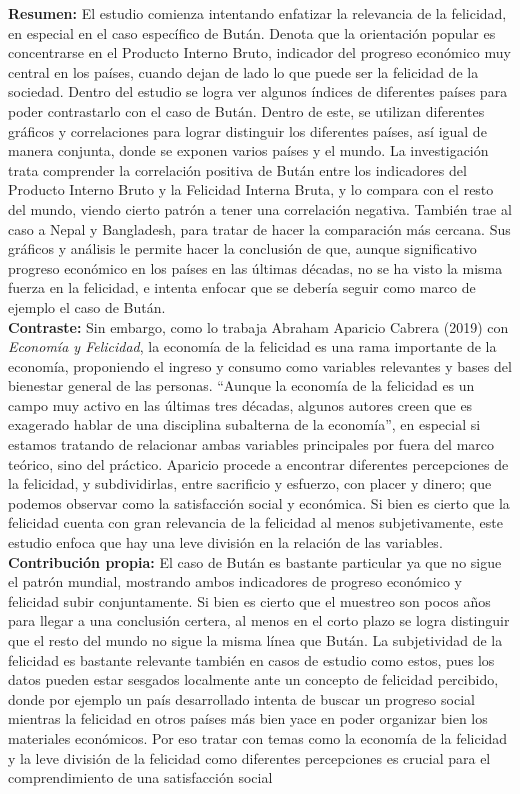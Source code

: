 \textbf{Resumen:} El estudio comienza intentando enfatizar la relevancia de la felicidad, en especial en el caso específico de Bután. Denota que la orientación popular es concentrarse en el Producto Interno Bruto, indicador del progreso económico muy central en los países, cuando dejan de lado lo que puede ser la felicidad de la sociedad. Dentro del estudio se logra ver algunos índices de diferentes países para poder contrastarlo con el caso de Bután. Dentro de este, se utilizan diferentes gráficos y correlaciones para lograr distinguir los diferentes países, así igual de manera conjunta, donde se exponen varios países y el mundo. La investigación trata comprender la correlación positiva de Bután entre los indicadores del Producto Interno Bruto y la Felicidad Interna Bruta, y lo compara con el resto del mundo, viendo cierto patrón a tener una correlación negativa. También trae al caso a Nepal y Bangladesh, para tratar de hacer la comparación más cercana. Sus gráficos y análisis le permite hacer la conclusión de que, aunque significativo progreso económico en los países en las últimas décadas, no se ha visto la misma fuerza en la felicidad, e intenta enfocar que se debería seguir como marco de ejemplo el caso de Bután. \\

\textbf{Contraste:} Sin embargo, como lo trabaja Abraham Aparicio Cabrera (2019) con \textit{Economía y Felicidad}, la economía de la felicidad es una rama importante de la economía, proponiendo el ingreso y consumo como variables relevantes y bases del bienestar general de las personas. ``Aunque la economía de la felicidad es un campo muy activo en las últimas tres décadas, algunos autores creen que es exagerado hablar de una disciplina subalterna de la economía'', en especial si estamos tratando de relacionar ambas variables principales por fuera del marco teórico, sino del práctico. Aparicio procede a encontrar diferentes percepciones de la felicidad, y subdividirlas, entre sacrificio y esfuerzo, con placer y dinero; que podemos observar como la satisfacción social y económica. Si bien es cierto que la felicidad cuenta con gran relevancia de la felicidad al menos subjetivamente, este estudio enfoca que hay una leve división en la relación de las variables. \\

\textbf{Contribución propia:} El caso de Bután es bastante particular ya que no sigue el patrón mundial, mostrando ambos indicadores de progreso económico y felicidad subir conjuntamente. Si bien es cierto que el muestreo son pocos años para llegar a una conclusión certera, al menos en el corto plazo se logra distinguir que el resto del mundo no sigue la misma línea que Bután. La subjetividad de la felicidad es bastante relevante también en casos de estudio como estos, pues los datos pueden estar sesgados localmente ante un concepto de felicidad percibido, donde por ejemplo un país desarrollado intenta de buscar un progreso social mientras la felicidad en otros países más bien yace en poder organizar bien los materiales económicos. Por eso tratar con temas como la economía de la felicidad y la leve división de la felicidad como diferentes percepciones es crucial para el comprendimiento de una satisfacción social \\

